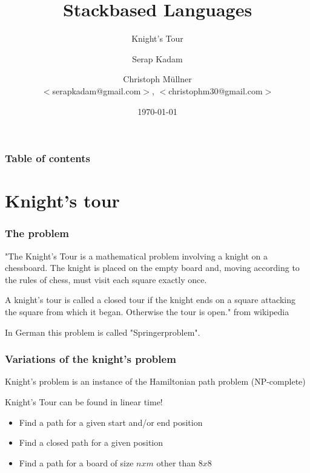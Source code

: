\documentclass{beamer}
\begin{document}
\title{Stackbased Languages}
\author[Serap Kadam \and Christoph M{\"u}llner]{Serap Kadam \and Christoph M{\"u}llner \\
$<$serapkadam@gmail.com$>$, $<$christophm30@gmail.com$>$}
\subtitle{Knight's Tour}

\date{\today} 

\begin{frame}
\titlepage
\end{frame}

\begin{frame}
\frametitle{Table of contents}
\tableofcontents
\end{frame} 

\section{Knight's tour} 
\begin{frame}
\frametitle{The problem}
"The Knight's Tour is a mathematical problem involving a knight
on a chessboard. The knight is placed on the empty board and,
moving according to the rules of chess, must visit each square
exactly once. 

A knight's tour is called a closed tour if the
knight ends on a square attacking the square from which it began.
Otherwise the tour is open." from wikipedia 

In German this problem is called "Springerproblem".

\end{frame}

\begin{frame}
\frametitle{Variations of the knight's problem}
 Knight's problem is an instance of the Hamiltonian path problem (NP-complete)
 
 Knight's Tour can be found in linear time!
\begin{itemize}
	\item Find a path for a given start and/or end position
	\item Find a closed path for a given position 
	\item Find a path for a board of size $n x m$ other than $8x8$
\end{itemize}
\end{frame}
\end{document}
